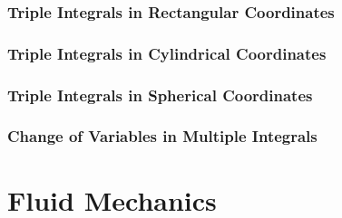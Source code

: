 \documentclass[11pt]{report}
\begin{document}
\subsection{Triple Integrals in Rectangular Coordinates}
\subsection{Triple Integrals in Cylindrical Coordinates}
\subsection{Triple Integrals in Spherical Coordinates}
\subsection{Change of Variables in Multiple Integrals} \label{sec:change_of_variables}
\chapter{Fluid Mechanics}
\end{document}
